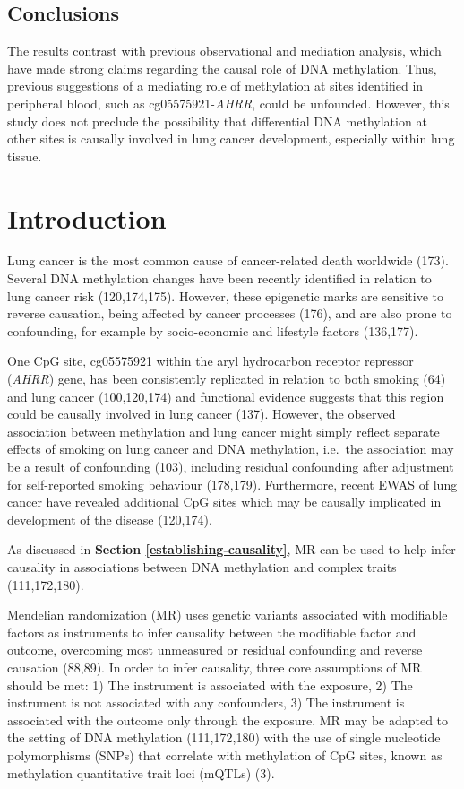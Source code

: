 \documentclass[11pt,oneside]{bristolthesis}
\begin{document}
\hypertarget{abstract-conclusions-07}{%
\subsection{Conclusions}\label{abstract-conclusions-07}}

The results contrast with previous observational and mediation analysis, which have made strong claims regarding the causal role of DNA methylation. Thus, previous suggestions of a mediating role of methylation at sites identified in peripheral blood, such as cg05575921-\emph{AHRR}, could be unfounded. However, this study does not preclude the possibility that differential DNA methylation at other sites is causally involved in lung cancer development, especially within lung tissue.

\hypertarget{introduction-07}{%
\section{Introduction}\label{introduction-07}}

Lung cancer is the most common cause of cancer-related death worldwide (173). Several DNA methylation changes have been recently identified in relation to lung cancer risk (120,174,175). However, these epigenetic marks are sensitive to reverse causation, being affected by cancer processes (176), and are also prone to confounding, for example by socio-economic and lifestyle factors (136,177).

One CpG site, cg05575921 within the aryl hydrocarbon receptor repressor (\emph{AHRR}) gene, has been consistently replicated in relation to both smoking (64) and lung cancer (100,120,174) and functional evidence suggests that this region could be causally involved in lung cancer (137). However, the observed association between methylation and lung cancer might simply reflect separate effects of smoking on lung cancer and DNA methylation, i.e.~the association may be a result of confounding (103), including residual confounding after adjustment for self-reported smoking behaviour (178,179). Furthermore, recent EWAS of lung cancer have revealed additional CpG sites which may be causally implicated in development of the disease (120,174).

As discussed in \textbf{Section \ref{establishing-causality}}, MR can be used to help infer causality in associations between DNA methylation and complex traits (111,172,180).

Mendelian randomization (MR) uses genetic variants associated with modifiable factors as instruments to infer causality between the modifiable factor and outcome, overcoming most unmeasured or residual confounding and reverse causation (88,89). In order to infer causality, three core assumptions of MR should be met: 1) The instrument is associated with the exposure, 2) The instrument is not associated with any confounders, 3) The instrument is associated with the outcome only through the exposure. MR may be adapted to the setting of DNA methylation (111,172,180) with the use of single nucleotide polymorphisms (SNPs) that correlate with methylation of CpG sites, known as methylation quantitative trait loci (mQTLs) (3).
\end{document}
